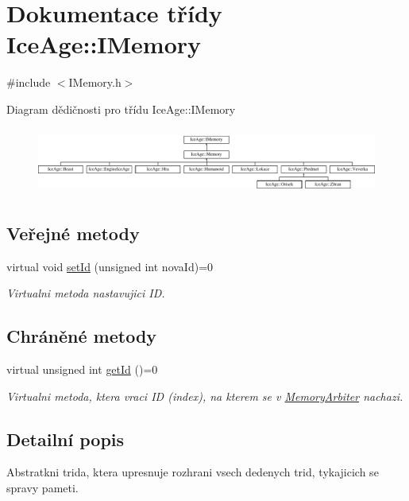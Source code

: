 \hypertarget{classIceAge_1_1IMemory}{}\section{Dokumentace třídy Ice\+Age\+:\+:I\+Memory}
\label{classIceAge_1_1IMemory}


{\ttfamily \#include $<$I\+Memory.\+h$>$}

Diagram dědičnosti pro třídu Ice\+Age\+:\+:I\+Memory\begin{figure}[H]
\begin{center}
\leavevmode
\includegraphics[height=2.206897cm]{d5/dfe/classIceAge_1_1IMemory}
\end{center}
\end{figure}
\subsection*{Veřejné metody}
\begin{DoxyCompactItemize}
\item 
virtual void \hyperlink{classIceAge_1_1IMemory_ab1e3adeca064926cd54773d50e5b508f}{set\+Id} (unsigned int nova\+Id)=0
\begin{DoxyCompactList}\small\item\em Virtualni metoda nastavujici ID. \end{DoxyCompactList}\end{DoxyCompactItemize}
\subsection*{Chráněné metody}
\begin{DoxyCompactItemize}
\item 
virtual unsigned int \hyperlink{classIceAge_1_1IMemory_a6daed1a6ad4faf52393d6437866bf330}{get\+Id} ()=0
\begin{DoxyCompactList}\small\item\em Virtualni metoda, ktera vraci ID (index), na kterem se v \hyperlink{classIceAge_1_1MemoryArbiter}{Memory\+Arbiter} nachazi. \end{DoxyCompactList}\end{DoxyCompactItemize}


\subsection{Detailní popis}
Abstratkni trida, ktera upresnuje rozhrani vsech dedenych trid, tykajicich se spravy pameti. 

